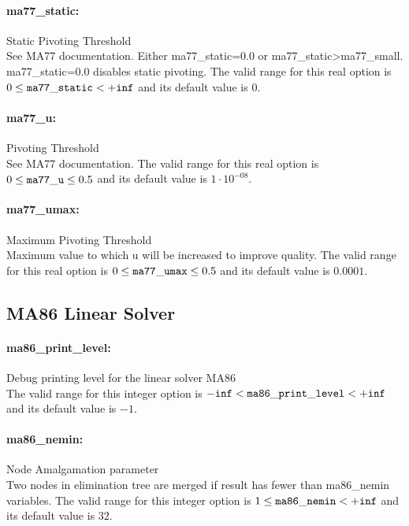 \paragraph{ma77\_static:}\label{opt:ma77_static} Static Pivoting Threshold \\
 See MA77 documentation. Either ma77\_static=0.0 or ma77\_static>ma77\_small. ma77\_static=0.0 disables static pivoting. The valid range for this real option is 
$0 \le {\tt ma77\_static } <  {\tt +inf}$
and its default value is $0$.


\paragraph{ma77\_u:}\label{opt:ma77_u} Pivoting Threshold \\
 See MA77 documentation. The valid range for this real option is 
$0 \le {\tt ma77\_u } \le 0.5$
and its default value is $1 \cdot 10^{-08}$.


\paragraph{ma77\_umax:}\label{opt:ma77_umax} Maximum Pivoting Threshold \\
 Maximum value to which u will be increased to improve quality. The valid range for this real option is 
$0 \le {\tt ma77\_umax } \le 0.5$
and its default value is $0.0001$.


\subsection{MA86 Linear Solver}

\paragraph{ma86\_print\_level:}\label{opt:ma86_print_level} Debug printing level for the linear solver MA86 \\
 The valid range for this integer option is
${\tt -inf} <  {\tt ma86\_print\_level } <  {\tt +inf}$
and its default value is $-1$.


\paragraph{ma86\_nemin:}\label{opt:ma86_nemin} Node Amalgamation parameter \\
 Two nodes in elimination tree are merged if result has fewer than ma86\_nemin variables. The valid range for this integer option is
$1 \le {\tt ma86\_nemin } <  {\tt +inf}$
and its default value is $32$.


